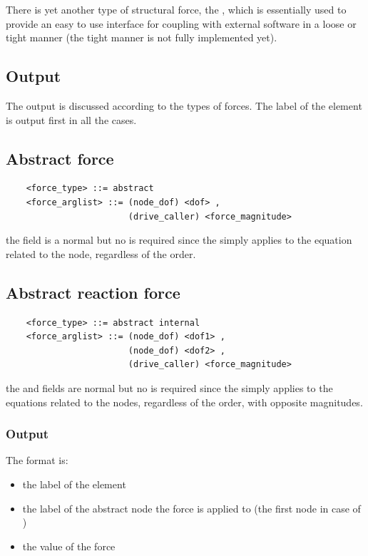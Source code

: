There is yet another type of structural force,
the , which is essentially used to provide
an easy to use interface for coupling with external software
in a loose or tight manner (the tight manner is not fully implemented yet).

\subsection{Output}
The output is discussed according to the types of forces. 
The label of the element is output first in all the cases.

\subsection{Abstract force}\label{sec:EL:FORCE:ABSTRACT}
\begin{verbatim}
    <force_type> ::= abstract 
    <force_arglist> ::= (node_dof) <dof> ,
                        (drive_caller) <force_magnitude>
\end{verbatim}
the  field is a normal  but no  is required
since the  simply applies to the equation related to the node,
regardless of the order.

\subsection{Abstract reaction force}
\begin{verbatim}
    <force_type> ::= abstract internal
    <force_arglist> ::= (node_dof) <dof1> ,
                        (node_dof) <dof2> ,
                        (drive_caller) <force_magnitude>
\end{verbatim}
the  and  fields are normal 
but no  is required since the  simply applies
to the equations related to the nodes, regardless of the order, with
opposite magnitudes.

\subsubsection{Output}
The format is:
\begin{itemize}
    \item the label of the element
    \item the label of the abstract node the force is applied to
	(the first node in case of )
    \item the value of the force
\end{itemize}


